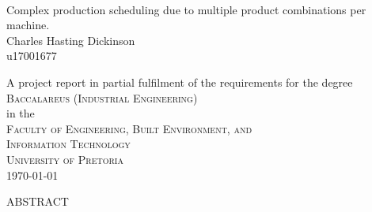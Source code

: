 \documentclass[a4paper,11pt,fleqn]{report}
\begin{document}
\
\thispagestyle{empty}
\begin{center}
{\huge Complex production scheduling due to multiple product combinations per machine.}
\vspace{20mm} \\
{\Large Charles Hasting Dickinson}
\vspace{5mm} \\
{\Large u17001677}
\vfill

A project report in partial fulfilment of the requirements for the degree\\
\vspace{10mm}
{\Large \textsc{Baccalareus (Industrial Engineering)}} \\
\vfill
%
in the \\
\vspace{20mm}
%
{\Large \textsc{Faculty of Engineering, Built Environment, and \\ 
Information Technology}}\\
%
\vspace{10mm}
{\Large\textsc{University of Pretoria}} \\
%
\vfill
%
\today 
\end{center}
\pagenumbering{roman}



ABSTRACT
\end{document}
